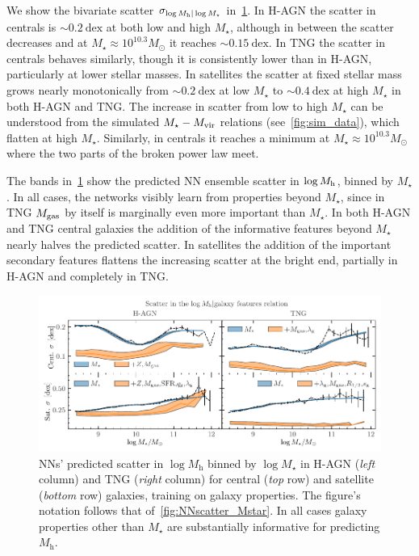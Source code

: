\documentclass[useAMS,usenatbib]{mnras}
\begin{document}
We show the bivariate scatter $\sigma_{\log M_{\rm h} | \log M_\star}$ in~\cref{fig:NNscatter_Mvir}. In H-AGN the scatter in centrals is $\sim0.2~\mathrm{dex}$ at both low and high $M_\star$, although in between the scatter decreases and at $M_\star\approx 10^{10.3} M_\odot$ it reaches $\sim0.15~\mathrm{dex}$. In TNG the scatter in centrals behaves similarly, though it is consistently lower than in H-AGN, particularly at lower stellar masses. In satellites the scatter at fixed stellar mass grows nearly monotonically from $\sim0.2~\mathrm{dex}$ at low $M_\star$ to $\sim0.4~\mathrm{dex}$ at high $M_\star$ in both H-AGN and TNG. The increase in scatter from low to high $M_\star$ can be understood from the simulated $M_\star - M_{\rm vir}$ relations (see~\cref{fig:sim_data}), which flatten at high $M_\star$. Similarly, in centrals it reaches a minimum at $M_\star \approx 10^{10.3} M_\odot$ where the two parts of the broken power law meet.

The bands in~\cref{fig:NNscatter_Mvir} show the predicted NN ensemble scatter in $\log M_{\rm h}$, binned by $M_\star$. In all cases, the networks visibly learn from properties beyond $M_\star$, since in TNG $M_{\rm gas}$ by itself is marginally even more important than $M_{\star}$. In both H-AGN and TNG central galaxies the addition of the informative features beyond $M_\star$ nearly halves the predicted scatter. In satellites the addition of the important secondary features flattens the increasing scatter at the bright end, partially in H-AGN and completely in TNG.


\begin{figure}
    \centering
    \includegraphics[width=\textwidth]{Figures/NN_scatter_Mvir.pdf}
    \caption{\acp{NN}' predicted scatter in $\log M_\mathrm{h}$ binned by $\log M_\star$ in H-AGN (\emph{left} column) and TNG (\emph{right} column) for central (\emph{top} row) and satellite (\emph{bottom} row) galaxies, training on galaxy properties. The figure's notation follows that of~\cref{fig:NNscatter_Mstar}. In all cases galaxy properties other than $M_\star$ are substantially informative for predicting $M_\text{h}$.}
    \label{fig:NNscatter_Mvir}
\end{figure}
\end{document}

